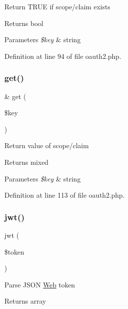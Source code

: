 Return T\+R\+UE if scope/claim exists \begin{DoxyReturn}{Returns}
bool 
\end{DoxyReturn}

\begin{DoxyParams}{Parameters}
{\em \$key} & string \\
\hline
\end{DoxyParams}


Definition at line 94 of file oauth2.\+php.

\hypertarget{class_web_1_1_o_auth2_ac3695923790b06917410e205068b8376}{}\label{class_web_1_1_o_auth2_ac3695923790b06917410e205068b8376} 
\subsubsection{\texorpdfstring{get()}{get()}}
{\footnotesize\ttfamily \& get (\begin{DoxyParamCaption}\item[{}]{\$key }\end{DoxyParamCaption})}

Return value of scope/claim \begin{DoxyReturn}{Returns}
mixed 
\end{DoxyReturn}

\begin{DoxyParams}{Parameters}
{\em \$key} & string \\
\hline
\end{DoxyParams}


Definition at line 113 of file oauth2.\+php.

\hypertarget{class_web_1_1_o_auth2_a0520d136dfbea7d3360681b460d23a3c}{}\label{class_web_1_1_o_auth2_a0520d136dfbea7d3360681b460d23a3c} 
\subsubsection{\texorpdfstring{jwt()}{jwt()}}
{\footnotesize\ttfamily jwt (\begin{DoxyParamCaption}\item[{}]{\$token }\end{DoxyParamCaption})}

Parse J\+S\+ON \hyperlink{class_web}{Web} token \begin{DoxyReturn}{Returns}
array 
\end{DoxyReturn}

